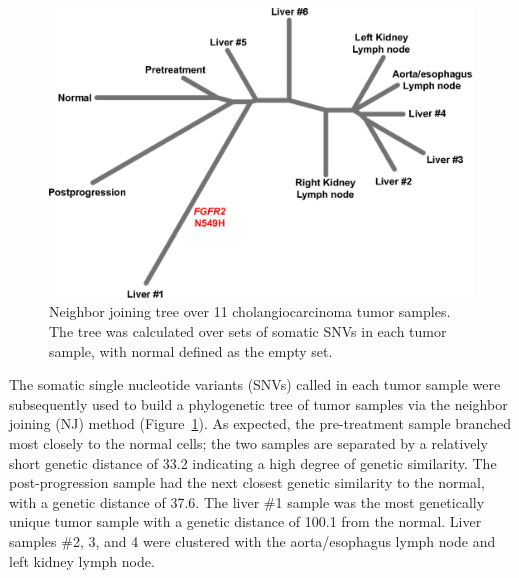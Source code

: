 \begin{figure}[htp]
	\centering
	\includegraphics[width=0.8\linewidth,keepaspectratio]{images/240/nj_tree}
	\caption[Neighbor joining tree over 11 cholangiocarcinoma tumor samples.]{Neighbor joining tree over 11 cholangiocarcinoma tumor samples. The tree was calculated over sets of somatic SNVs in each tumor sample, with normal defined as the empty set.}
	\label{fig:240:nj_tree}
\end{figure}
The somatic single nucleotide variants (SNVs) called in each tumor sample were subsequently used to build a phylogenetic tree of tumor samples via the neighbor joining (NJ) method \cite{saitou1987} (Figure~\ref{fig:240:nj_tree}). As expected, the pre-treatment sample branched most closely to the normal cells; the two samples are separated by a relatively short genetic distance of 33.2 indicating a high degree of genetic similarity. The post-progression sample had the next closest genetic similarity to the normal, with a genetic distance of 37.6. The liver \#1 sample was the most genetically unique tumor sample with a genetic distance of 100.1 from the normal. Liver samples \#2, 3, and 4 were clustered with the aorta/esophagus lymph node and left kidney lymph node.

